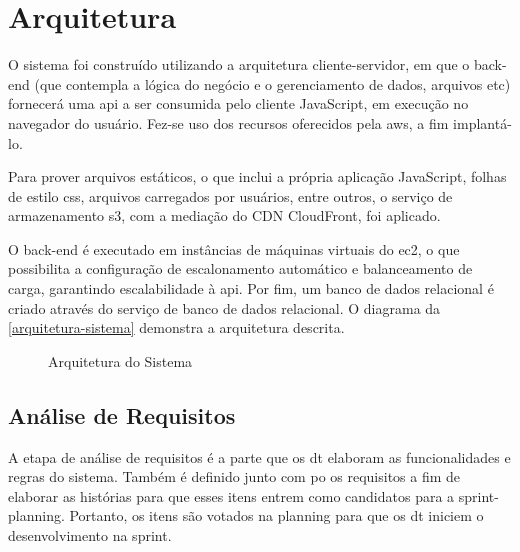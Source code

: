 \section{Arquitetura}
    O sistema foi construído utilizando a arquitetura cliente-servidor, em que o back-end (que contempla a lógica do negócio e o gerenciamento de dados, arquivos etc) fornecerá uma \ac{api} a ser consumida pelo cliente \gls{JavaScript}, em execução no navegador do usuário. Fez-se uso dos recursos oferecidos pela \ac{aws}, a fim implantá-lo.

    Para prover arquivos estáticos, o que inclui a própria aplicação \ac{JavaScript}, folhas de estilo \ac{css}, arquivos carregados por usuários, entre outros, o serviço de armazenamento \ac{s3}, com a mediação do CDN CloudFront, foi aplicado.

    O back-end é executado em instâncias de máquinas virtuais do \ac{ec2}, o que possibilita a configuração de escalonamento automático e balanceamento de carga, garantindo escalabilidade à \ac{api}. Por fim, um banco de dados relacional é criado através do serviço de banco de dados relacional. O diagrama da \autoref{arquitetura-sistema} demonstra a arquitetura descrita.

\begin{figure}[H]
    \centering
    \caption{\label{arquitetura-sistema}Arquitetura do Sistema}
\end{figure}

\subsection{Análise de Requisitos}
    A etapa de análise de requisitos é a parte que os \ac{dt} elaboram as funcionalidades e regras do sistema. Também é definido junto com \ac{po} os requisitos a fim de elaborar as histórias para que esses itens entrem como candidatos para a \gls{sprint-planning}. Portanto, os itens são votados na planning para que os \ac{dt} iniciem o desenvolvimento na sprint.
    
